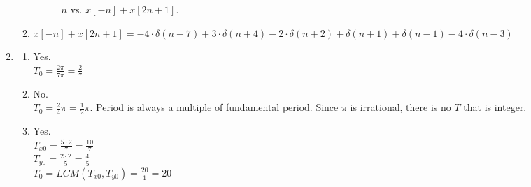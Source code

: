 \documentclass[10pt,a4paper, margin=1in]{article}
\begin{document}
\begin{enumerate}
\begin{enumerate}
\begin{figure} [h!]
    \centering
    \caption{$n$ vs. $x[-n]+x[2n+1]$.}
    \label{fig:q3}
\end{figure}

    \item $x[-n]+x[2n+1] = -4 \cdot \delta(n+7) + 3 \cdot \delta(n+4) - 2 \cdot \delta(n+2) + \delta(n+1) + \delta(n-1) - 4 \cdot \delta(n-3)$
    
    \end{enumerate} 



\item %
    \begin{enumerate}
    \item Yes.\\
    
    $T_0 = \frac{2\pi}{7\pi} = \frac{2}{7}$
    \item No.\\
    
    $T_0 = \frac{2}{4}\pi = \frac{1}{2}\pi$. Period is always a multiple of fundamental period. Since $\pi$ is irrational, there is no $T$ that is integer.
    \item Yes.\\
    
    $T_{x0} = \frac{5 \cdot 2}{7} = \frac{10}{7}$\\
    
    $T_{y0} = \frac{2 \cdot 2}{5} = \frac{4}{5}$\\

    $T_0 = LCM(T_{x0}, T_{y0}) = \frac{20}{1} = 20 $\\
    \end{enumerate}



\end{enumerate}
\end{document}
